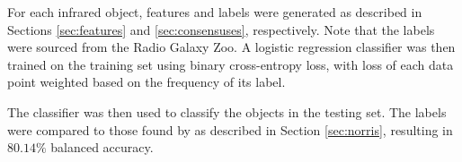     For each infrared object, features and labels were generated as described in Sections \ref{sec:features} and \ref{sec:consensuses}, respectively. Note that the labels were sourced from the Radio Galaxy Zoo. A logistic regression classifier was then trained on the training set using binary cross-entropy loss, with loss of each data point weighted based on the frequency of its label.

    The classifier was then used to classify the objects in the testing set. The labels were compared to those found by \citet{norris06} as described in Section \ref{sec:norris}, resulting in $80.14\%$ balanced accuracy.

